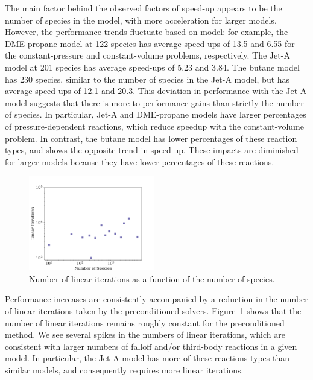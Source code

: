 \documentclass[twocolumn,10pt]{article}
\newcommand{\revised}[2]{#1}  %
\begin{document}
\revised{The main factor behind the observed factors of speed-up appears to be the number of species in the model, with more acceleration for larger models.
However, the performance trends fluctuate based on model: for example, the DME-propane model at 122 species has average speed-ups of 13.5 and 6.55 for the constant-pressure and constant-volume problems, respectively. 
The Jet-A model at 201 species has average speed-ups of 5.23 and 3.84.
The butane model has 230 species, similar to the number of species in the Jet-A model, but has average speed-ups of 12.1 and 20.3. 
This deviation in performance with the Jet-A model suggests that there is more to performance gains than strictly the number of species. 
In particular, Jet-A and DME-propane models have larger percentages of pressure-dependent reactions, which reduce speedup with the constant-volume problem.
In contrast, the butane model has lower percentages of these reaction types, and shows the opposite trend in speed-up. 
These impacts are diminished for larger models because they have lower percentages of these reactions.
}{revTwo}

\begin{figure}[htb]
\centering
\includegraphics[width=0.49\textwidth]{figures/LinIters-Nspecies-pressure_problem.pdf}
\caption{Number of linear iterations as a function of the number of species.}
\label{fig:lin-iters-log}
\end{figure}

Performance increases are consistently accompanied by a reduction in the number of linear iterations taken by the preconditioned solvers.
Figure~\ref{fig:lin-iters-log} shows that the number of linear iterations remains roughly constant for the preconditioned method.
We see several spikes in the numbers of linear iterations, which are consistent with larger numbers of falloff and/or third-body reactions in a given model.
In particular, the Jet-A model has more of these reactions types than similar models, and consequently requires more linear iterations.
\end{document}
